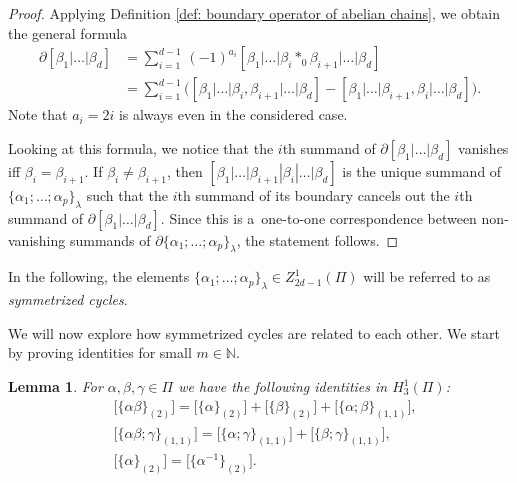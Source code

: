 \documentclass[10pt,a4paper]{amsart}
\numberwithin{equation}{section}
\newtheorem{Lemma}[Theorem]{Lemma}
\newcommand{\NN }{\mathbb{N}}
\begin{document}
\begin{proof}
 Applying Definition \ref{def: boundary operator of abelian chains}, we obtain the general formula{\samepage
 \begin{align*}
 \partial [\beta_1|\dots| \beta_d] &= \sum_{i=1}^{d-1}\,(-1)^{a_i}[\beta_1|\dots|\beta_i \ast_0 \beta_{i+1} | \dots | \beta_d] \\
 &= \sum_{i=1}^{d-1}\big([\beta_1|\dots|\beta_i, \beta_{i+1} | \dots | \beta_d] - [\beta_1|\dots|\beta_{i+1}, \beta_i | \dots | \beta_d] \big).
 \end{align*}
 Note that $a_i=2i$ is always even in the considered case.}

 Looking at this formula, we notice that the $i$th summand of $\partial [\beta_1|\dots| \beta_d]$ vanishes iff $\beta_i=\beta_{i+1}$. If $\beta_i \neq \beta_{i+1}$, then $[\beta_1|\dots|\beta_{i+1}|\beta_i| \dots | \beta_d]$ is the unique summand of $\{\alpha_1;\dots ;\alpha_p\}_\lambda$ such that the $i$th summand of its boundary cancels out the $i$th summand of $\partial [\beta_1|\dots| \beta_d]$. Since this is a~one-to-one correspondence between non-vanishing summands of $\partial \{\alpha_1;\dots ;\alpha_p\}_\lambda$, the statement follows.
\end{proof}

In the following, the elements $\{\alpha_1;\dots ;\alpha_p\}_\lambda \in Z_{2d-1}^1(\Pi)$ will be referred to as {\it symmetrized cycles}.

We will now explore how symmetrized cycles are related to each other. We start by proving identities for small $m \in \NN$.

\begin{Lemma}
 For $\alpha,\beta,\gamma \in \Pi$ we have the following identities in $H_{3}^1(\Pi)$:
 \begin{align*}
 &\big[\{\alpha\beta\}_{(2)} \big]=\big[\{\alpha\}_{(2)}\big]+\big[\{\beta\}_{(2)}\big]+\big[\{\alpha;\beta\}_{(1,1)}\big],\\
& \big[\{\alpha\beta;\gamma\}_{(1,1)}\big]=\big[\{\alpha;\gamma\}_{(1,1)}\big]+\big[\{\beta;\gamma\}_{(1,1)}\big],\\
 &\big[\{\alpha\}_{(2)}\big]=\big[\big\{\alpha^{-1}\big\}_{(2)}\big].
 \end{align*}
\end{Lemma}
\end{document}
